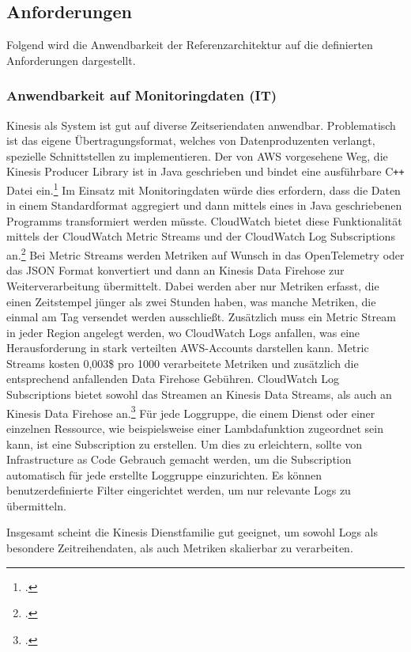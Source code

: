 
\subsection{Anforderungen}
Folgend wird die Anwendbarkeit der Referenzarchitektur auf die definierten Anforderungen dargestellt.
\subsubsection{Anwendbarkeit auf Monitoringdaten (IT)}
Kinesis als System ist gut auf diverse Zeitseriendaten anwendbar. Problematisch ist das eigene Übertragungsformat, welches von Datenproduzenten verlangt, spezielle Schnittstellen zu implementieren. Der von \ac{AWS} vorgesehene Weg, die Kinesis Producer Library ist in Java geschrieben und bindet eine ausführbare C\texttt{++} Datei ein.\footcite[Vgl.][]{AmazonWebServicesInc..o.J.bg} Im Einsatz mit Monitoringdaten würde dies erfordern, dass die Daten in einem Standardformat aggregiert und dann mittels eines in Java geschriebenen Programms transformiert werden müsste. 
CloudWatch bietet diese Funktionalität mittels der CloudWatch Metric Streams und der CloudWatch Log Subscriptions an.\footcite[Vgl. auch im Folgenden][]{Barr.2021} Bei Metric Streams werden Metriken auf Wunsch in das OpenTelemetry oder das \ac{JSON} Format konvertiert und dann an Kinesis Data Firehose zur Weiterverarbeitung übermittelt. Dabei werden aber nur Metriken erfasst, die einen Zeitstempel jünger als zwei Stunden haben, was manche Metriken, die einmal am Tag versendet werden ausschließt. Zusätzlich muss ein Metric Stream in jeder Region angelegt werden, wo CloudWatch Logs anfallen, was eine Herausforderung in stark verteilten \ac{AWS}-Accounts darstellen kann. Metric Streams kosten 0,003\$ pro 1000 verarbeitete Metriken und zusätzlich die entsprechend anfallenden Data Firehose Gebühren. CloudWatch Log Subscriptions bietet sowohl das Streamen an Kinesis Data Streams, als auch an Kinesis Data Firehose an.\footcite[Vgl. auch im Folgenden][]{AmazonWebServicesInc..o.J.bk} Für jede Loggruppe, die einem Dienst oder einer einzelnen Ressource, wie beispielsweise einer Lambdafunktion zugeordnet sein kann, ist eine Subscription zu erstellen. Um dies zu erleichtern, sollte von Infrastructure as Code Gebrauch gemacht werden, um die Subscription automatisch für jede erstellte Loggruppe einzurichten. Es können benutzerdefinierte Filter eingerichtet werden, um nur relevante Logs zu übermitteln.

Insgesamt scheint die Kinesis Dienstfamilie gut geeignet, um sowohl Logs als besondere Zeitreihendaten, als auch Metriken skalierbar zu verarbeiten.

